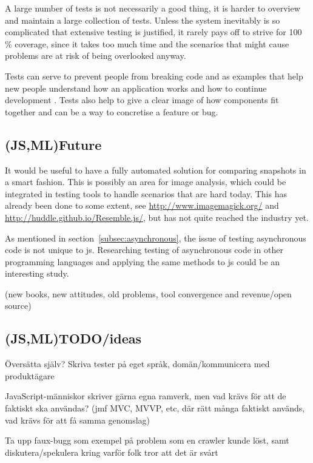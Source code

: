 \documentclass[11pt]{article}
\begin{document}
A large number of tests is not necessarily a good thing, it is harder to overview and maintain a large collection of tests. Unless the system inevitably is so complicated that extensive testing is justified, it rarely pays off to strive for 100 \% coverage, since it takes too much time and the scenarios that might cause problems are at risk of being overlooked anyway. \cite[question~28]{Edelstam}

Tests can serve to prevent people from breaking code and as examples that help new people understand how an application works and how to continue development \cite[questions~31-32]{Edelstam}. Tests also help to give a clear image of how components fit together and can be a way to concretise a feature or bug.


\subsection{(JS,ML)Future}

It would be useful to have a fully automated solution for comparing snapshots in a smart fashion. This is possibly an area for image analysis, which could be integrated in testing tools to handle scenarios that are hard today. This has already been done to some extent, see \url{http://www.imagemagick.org/} and \url{http://huddle.github.io/Resemble.js/}, but has not quite reached the industry yet.

As mentioned in section~\ref{subsec:asynchronous}, the issue of testing asynchronous code is not unique to \gls{js}. Researching testing of asynchronous code in other programming languages and applying the same methods to \gls{js} could be an interesting study.

(new books, new attitudes, old problems, tool convergence and revenue/open source)

\subsection{(JS,ML)TODO/ideas}

Översätta själv? Skriva tester på eget språk, domän/kommunicera med produktägare

JavaScript-människor skriver gärna egna ramverk, men vad krävs för att de faktiskt ska användas? (jmf MVC, MVVP, etc, där rätt många faktiskt används, vad krävs för att få samma genomslag)

Ta upp faux-bugg som exempel på problem som en crawler kunde löst, samt diskutera/spekulera kring varför folk tror att det är svårt
\end{document}
